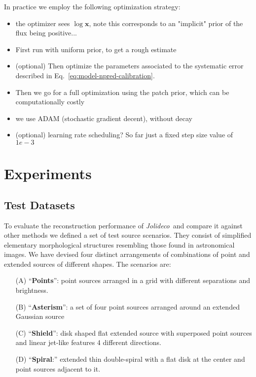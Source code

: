 \documentclass[twocolumn]{aastex631}
\newcommand{\jolideco}{\textit{Jolideco}~}
\begin{document}
    In practice we employ the following optimization strategy:
    \begin{itemize}
        \item the optimizer sees $\log{\mathbf{x}}$, note this corresponds to an "implicit" prior of the flux being positive...
        \item First run with uniform prior, to get a rough estimate
        \item (optional) Then optimize the parameters associated to the systematic error described in Eq.~\ref{eq:model-npred-calibration}.
        \item Then we go for a full optimization using the patch prior, which can be computationally costly
        \item we use ADAM (stochastic gradient decent), without decay
        \item  (optional) learning rate scheduling? So far just a fixed step size value of $1e-3$
    \end{itemize}
    
    
        
    \section{Experiments}
    \subsection{Test Datasets}
    \label{subsec:test-datasets}

    To evaluate the reconstruction performance of \jolideco and compare it against other methods we defined a set of test source scenarios. They consist of simplified elementary morphological structures resembling those found in astronomical images. We have devised four distinct arrangements of combinations of point and extended sources of different shapes. The scenarios are:
    
    \begin{itemize}
        \item[(A)] {\enquote{\bf Points}:} point sources arranged in a grid with different separations and brightness. 
        \item[(B)] {\enquote{\bf Asterism}:} a set of four point sources arranged around an extended Gaussian source
        \item[(C)] {\enquote{\bf Shield}:} disk shaped flat extended source with superposed point sources and linear jet-like features 4 different directions.
        \item[(D)] \enquote{{\bf Spiral}:} extended thin double-spiral with a flat disk at the center and point sources adjacent to it. 
    \end{itemize}
\end{document}
